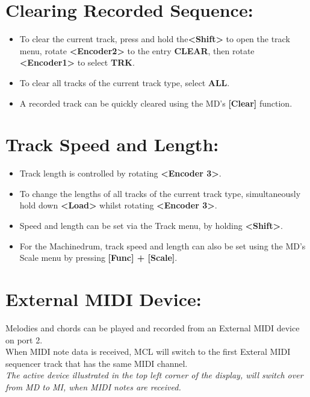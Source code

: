 \section{Clearing Recorded Sequence:}
\begin{itemize}
\item To clear the current track, press and hold the\textbf{<Shift>} to open the track menu, rotate \textbf{<Encoder2>} to the entry \textbf{CLEAR}, then rotate \textbf{<Encoder1>} to select \textbf{TRK}.
\item To clear all tracks of the current track type, select \textbf{ALL}.
\item A recorded track can be quickly cleared using the MD's \textbf{[Clear]} function.
\end{itemize}

\section{Track Speed and Length:}
\begin{itemize}
\item Track length is controlled by rotating \textbf{<Encoder 3>}.
\item To change the lengths of all tracks of the current track type, simultaneously hold down \textbf{<Load>} whilst rotating \textbf{<Encoder 3>}.
\item Speed and length can be set via the Track menu, by holding \textbf{<Shift>}.
\item For the Machinedrum, track speed and length can also be set using the MD's Scale menu by pressing \textbf{[Func] + [Scale]}.
\end{itemize}
\newpage
\section{External MIDI Device:}
Melodies and chords can be played and recorded from an External MIDI device on port 2.
\\

When MIDI note data is received, MCL will switch to the first Exteral MIDI sequencer track that has the same MIDI channel.
\\

\textit{The active device illustrated in the top left corner of the display, will switch over from MD to MI, when MIDI notes are received.}
\\